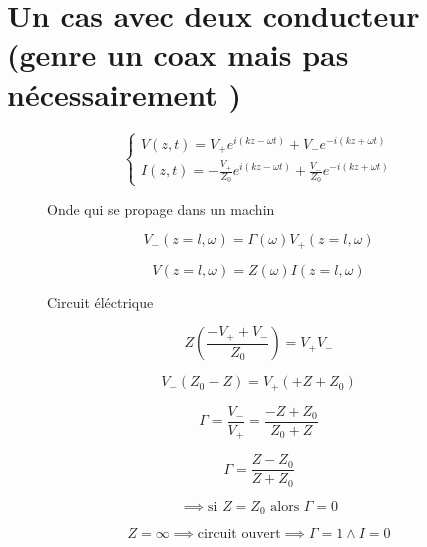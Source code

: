 


\section*{Un cas avec deux conducteur (genre un coax mais pas nécessairement )}

$$\begin{cases}
	V(z,t) = V_+ e^{i\left( kz -\omega t \right) } + V_- e^{-i\left( kz + \omega t \right) }\\ 
	I(z,t) = - \frac{V_+}{Z_0} e^{i\left( kz-\omega t \right) } + \frac{V_-}{Z_0} e^{-i\left( kz +\omega t \right) }
\end{cases}$$ 

\begin{figure}[ht]
    \centering
    \caption{Onde qui se propage dans un machin}
    \label{fig:onde-qui-se-propage-dans-un-machin}
\end{figure}

$$V_- (z=l, \omega) = \Gamma(\omega) V_+ (z=l, \omega) $$ 

$$V(z=l,\omega) = Z(\omega) I(z=l, \omega)$$ 

\begin{figure}[ht]
    \centering
    \caption{Circuit éléctrique}
    \label{fig:circuit-éléctrique}
\end{figure}

$$Z \left( \frac{-V_+ + V_-}{Z_0}  \right) = V_+ V_- $$ 

$$V_- (Z_0 -Z) = V_+ (+Z + Z_0) $$ 

$$\Gamma = \frac{V_-}{V_+} = \frac{-Z + Z_0 }{Z_0 + Z } $$ 

$$\boxed{\Gamma = \frac{Z-Z_0}{Z+Z_0} }$$ 

$$\implies \text{si } Z = Z_0 \text{ alors } \Gamma =0  $$ 

$$Z = \infty \implies \text{circuit ouvert} \implies \Gamma =1 \wedge  I=0 $$ 






